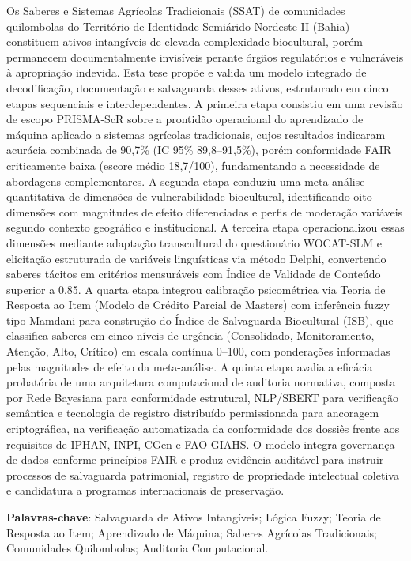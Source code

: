 \setlength{\absparsep}{18pt} %
\begin{resumo}
Os Saberes e Sistemas Agrícolas Tradicionais (SSAT) de comunidades quilombolas do Território de Identidade Semiárido Nordeste II (Bahia) constituem ativos intangíveis de elevada complexidade biocultural, porém permanecem documentalmente invisíveis perante órgãos regulatórios e vulneráveis à apropriação indevida. Esta tese propõe e valida um modelo integrado de decodificação, documentação e salvaguarda desses ativos, estruturado em cinco etapas sequenciais e interdependentes. A primeira etapa consistiu em uma revisão de escopo PRISMA-ScR sobre a prontidão operacional do aprendizado de máquina aplicado a sistemas agrícolas tradicionais, cujos resultados indicaram acurácia combinada de 90,7\% (IC 95\% 89,8--91,5\%), porém conformidade FAIR criticamente baixa (escore médio 18,7/100), fundamentando a necessidade de abordagens complementares. A segunda etapa conduziu uma meta-análise quantitativa de dimensões de vulnerabilidade biocultural, identificando oito dimensões com magnitudes de efeito diferenciadas e perfis de moderação variáveis segundo contexto geográfico e institucional. A terceira etapa operacionalizou essas dimensões mediante adaptação transcultural do questionário WOCAT-SLM e elicitação estruturada de variáveis linguísticas via método Delphi, convertendo saberes tácitos em critérios mensuráveis com Índice de Validade de Conteúdo superior a 0,85. A quarta etapa integrou calibração psicométrica via Teoria de Resposta ao Item (Modelo de Crédito Parcial de Masters) com inferência fuzzy tipo Mamdani para construção do Índice de Salvaguarda Biocultural (ISB), que classifica saberes em cinco níveis de urgência (Consolidado, Monitoramento, Atenção, Alto, Crítico) em escala contínua 0--100, com ponderações informadas pelas magnitudes de efeito da meta-análise. A quinta etapa avalia a eficácia probatória de uma arquitetura computacional de auditoria normativa, composta por Rede Bayesiana para conformidade estrutural, NLP/SBERT para verificação semântica e tecnologia de registro distribuído permissionada para ancoragem criptográfica, na verificação automatizada da conformidade dos dossiês frente aos requisitos de IPHAN, INPI, CGen e FAO-GIAHS. O modelo integra governança de dados conforme princípios FAIR e produz evidência auditável para instruir processos de salvaguarda patrimonial, registro de propriedade intelectual coletiva e candidatura a programas internacionais de preservação.

\textbf{Palavras-chave}: Salvaguarda de Ativos Intangíveis; Lógica Fuzzy; Teoria de Resposta ao Item; Aprendizado de Máquina; Saberes Agrícolas Tradicionais; Comunidades Quilombolas; Auditoria Computacional.
\end{resumo}


